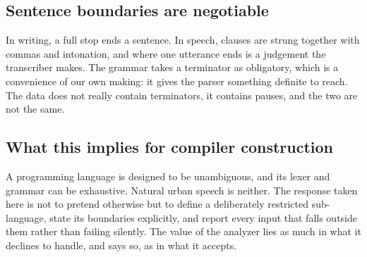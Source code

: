 \documentclass[11pt,a4paper]{article}
\begin{document}
\subsection{Sentence boundaries are negotiable}
In writing, a full stop ends a sentence. In speech, clauses are strung together with commas and intonation, and where one utterance ends is a judgement the transcriber makes. The grammar takes a terminator as obligatory, which is a convenience of our own making: it gives the parser something definite to reach. The data does not really contain terminators, it contains pauses, and the two are not the same.

\subsection{What this implies for compiler construction}
A programming language is designed to be unambiguous, and its lexer and grammar can be exhaustive. Natural urban speech is neither. The response taken here is not to pretend otherwise but to define a deliberately restricted sub-language, state its boundaries explicitly, and report every input that falls outside them rather than failing silently. The value of the analyzer lies as much in what it declines to handle, and says so, as in what it accepts.
\end{document}
